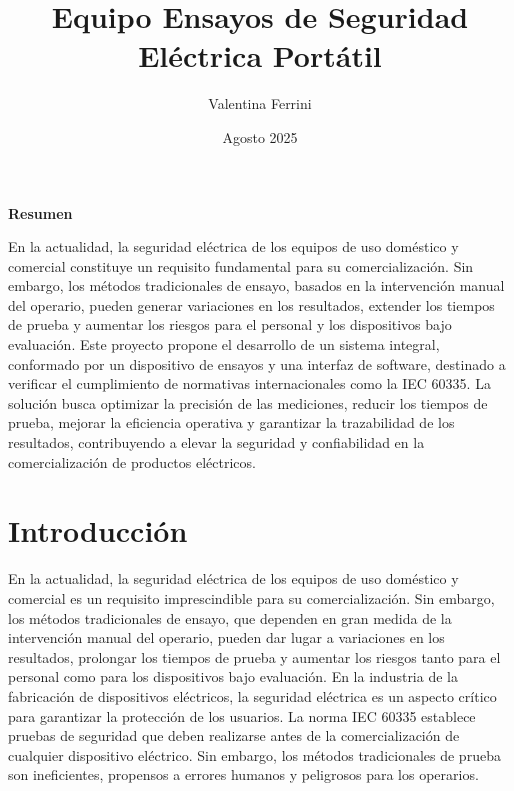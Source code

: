 \documentclass[a4paper,12pt]{article}
\title{Equipo Ensayos de Seguridad Eléctrica Portátil}
\author{Valentina Ferrini}
\date{Agosto 2025}
\begin{document}
\maketitle
\newpage

\begin{center}
    \textbf{\huge Resumen}
\end{center}
\vspace{1cm}
En la actualidad, la seguridad eléctrica de los equipos de uso doméstico y comercial constituye un requisito fundamental para su comercialización. Sin embargo, los métodos tradicionales de ensayo, basados en la intervención manual del operario, pueden generar variaciones en los resultados, extender los tiempos de prueba y aumentar los riesgos para el personal y los dispositivos bajo evaluación. Este proyecto propone el desarrollo de un sistema integral, conformado por un dispositivo de ensayos y una interfaz de software, destinado a verificar el cumplimiento de normativas internacionales como la IEC 60335. La solución busca optimizar la precisión de las mediciones, reducir los tiempos de prueba, mejorar la eficiencia operativa y garantizar la trazabilidad de los resultados, contribuyendo a elevar la seguridad y confiabilidad en la comercialización de productos eléctricos.

\newpage

\tableofcontents
\newpage

\section{Introducción}
En la actualidad, la seguridad eléctrica de los equipos de uso doméstico y comercial es un
requisito imprescindible para su comercialización. Sin embargo, los métodos tradicionales
de ensayo, que dependen en gran medida de la intervención manual del operario, pueden
dar lugar a variaciones en los resultados, prolongar los tiempos de prueba y aumentar los
riesgos tanto para el personal como para los dispositivos bajo evaluación.
En la industria de la fabricación de dispositivos eléctricos, la seguridad eléctrica es un aspecto crítico para garantizar la protección de los usuarios. La norma IEC 60335 establece pruebas de seguridad que deben realizarse antes de la comercialización de cualquier dispositivo eléctrico. Sin embargo, los métodos tradicionales de prueba son ineficientes, propensos a errores humanos y peligrosos para los operarios.
\end{document}
